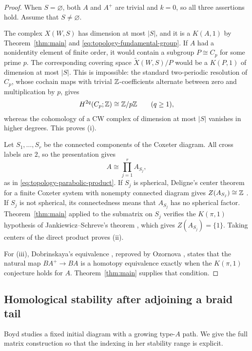 \begin{proof}
When \(S=\varnothing\), both \(A\) and \(A^+\) are trivial and \(k=0\),
so all three assertions hold.  Assume that \(S\ne\varnothing\).

The complex \(X(W,S)\) has dimension at most \(|S|\), and it is a
\(K(A,1)\) by Theorem~\ref{thm:main} and
\eqref{eq:topology-fundamental-group}.  If \(A\) had a nonidentity
element of finite order, it would contain a subgroup \(P\cong C_p\)
for some prime \(p\).  The corresponding covering space
\(\widetilde X(W,S)/P\) would be a \(K(P,1)\) of dimension at most
\(|S|\).  This is impossible: the standard two-periodic resolution of
\(C_p\), whose cochain maps with trivial \(\mathbb Z\)-coefficients alternate
between zero and multiplication by \(p\), gives
\[
  H^{2q}(C_p;\mathbb Z)\cong\mathbb Z/p\mathbb Z\qquad(q\ge1),
\]
whereas the cohomology of a CW complex of dimension at most \(|S|\)
vanishes in higher degrees.  This proves (i).

Let \(S_1,\ldots,S_r\) be the connected components of the Coxeter
diagram.  All cross labels are \(2\), so the presentation gives
\[
  A\cong\prod_{j=1}^r A_{S_j},
\]
as in \eqref{eq:topology-parabolic-product}.  If \(S_j\) is spherical,
Deligne's center theorem for a finite Coxeter system with nonempty
connected diagram gives \(Z(A_{S_j})\cong\mathbb Z\)
\cite[Theorem~4.21]{Deligne1972}.  If \(S_j\) is not spherical, its
connectedness means that \(A_{S_j}\) has no spherical factor.
Theorem~\ref{thm:main} applied to the submatrix on \(S_j\) verifies the
\(K(\pi,1)\) hypothesis of Jankiewicz--Schreve's theorem
\cite[Theorem~3]{JankiewiczSchreve2022}, which gives
\(Z(A_{S_j})=\{1\}\).  Taking centers of the direct product proves (ii).

For (iii), Dobrinskaya's equivalence
\cite[Theorem~2 and the following paragraph]{Dobrinskaya2002}, reproved by Ozornova
\cite[Section~5, especially Conjecture~5.9 and Theorem~5.10]{Ozornova2013},
states that the natural map \(BA^+\to BA\) is a homotopy equivalence
exactly when the \(K(\pi,1)\) conjecture holds for \(A\).
Theorem~\ref{thm:main} supplies that condition.
\end{proof}

\subsection{Homological stability after adjoining a braid tail}

Boyd studies a fixed initial diagram with a growing type-\(A\) path.
We give the full matrix construction so that the indexing in her
stability range is explicit.

